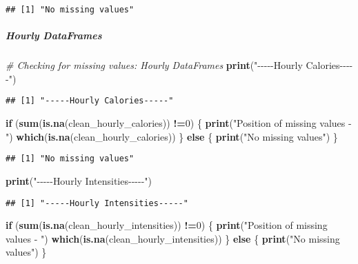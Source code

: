 \documentclass[
]{article}
\newenvironment{Shaded}{\begin{snugshade}}{\end{snugshade}}
\newcommand{\CommentTok}[1]{\textcolor[rgb]{0.56,0.35,0.01}{\textit{#1}}}
\newcommand{\ControlFlowTok}[1]{\textcolor[rgb]{0.13,0.29,0.53}{\textbf{#1}}}
\newcommand{\DecValTok}[1]{\textcolor[rgb]{0.00,0.00,0.81}{#1}}
\newcommand{\FunctionTok}[1]{\textcolor[rgb]{0.13,0.29,0.53}{\textbf{#1}}}
\newcommand{\NormalTok}[1]{#1}
\newcommand{\SpecialCharTok}[1]{\textcolor[rgb]{0.81,0.36,0.00}{\textbf{#1}}}
\newcommand{\StringTok}[1]{\textcolor[rgb]{0.31,0.60,0.02}{#1}}
\begin{document}
\begin{verbatim}
## [1] "No missing values"
\end{verbatim}

\hypertarget{hourly-dataframes-4}{%
\subparagraph{Hourly DataFrames}\label{hourly-dataframes-4}}

\begin{Shaded}
\begin{Highlighting}[]
\CommentTok{\# Checking for missing values: Hourly DataFrames}
\FunctionTok{print}\NormalTok{(}\StringTok{"{-}{-}{-}{-}{-}Hourly Calories{-}{-}{-}{-}{-}"}\NormalTok{)}
\end{Highlighting}
\end{Shaded}

\begin{verbatim}
## [1] "-----Hourly Calories-----"
\end{verbatim}

\begin{Shaded}
\begin{Highlighting}[]
\ControlFlowTok{if}\NormalTok{ (}\FunctionTok{sum}\NormalTok{(}\FunctionTok{is.na}\NormalTok{(clean\_hourly\_calories)) }\SpecialCharTok{!=}\DecValTok{0}\NormalTok{) \{}
  \FunctionTok{print}\NormalTok{(}\StringTok{"Position of missing values {-} "}\NormalTok{)}
  \FunctionTok{which}\NormalTok{(}\FunctionTok{is.na}\NormalTok{(clean\_hourly\_calories))}
\NormalTok{\} }\ControlFlowTok{else}\NormalTok{ \{}
  \FunctionTok{print}\NormalTok{(}\StringTok{"No missing values"}\NormalTok{)}
\NormalTok{\}}
\end{Highlighting}
\end{Shaded}

\begin{verbatim}
## [1] "No missing values"
\end{verbatim}

\begin{Shaded}
\begin{Highlighting}[]
\FunctionTok{print}\NormalTok{(}\StringTok{"{-}{-}{-}{-}{-}Hourly Intensities{-}{-}{-}{-}{-}"}\NormalTok{)}
\end{Highlighting}
\end{Shaded}

\begin{verbatim}
## [1] "-----Hourly Intensities-----"
\end{verbatim}

\begin{Shaded}
\begin{Highlighting}[]
\ControlFlowTok{if}\NormalTok{ (}\FunctionTok{sum}\NormalTok{(}\FunctionTok{is.na}\NormalTok{(clean\_hourly\_intensities)) }\SpecialCharTok{!=}\DecValTok{0}\NormalTok{) \{}
  \FunctionTok{print}\NormalTok{(}\StringTok{"Position of missing values {-} "}\NormalTok{)}
  \FunctionTok{which}\NormalTok{(}\FunctionTok{is.na}\NormalTok{(clean\_hourly\_intensities))}
\NormalTok{\} }\ControlFlowTok{else}\NormalTok{ \{}
  \FunctionTok{print}\NormalTok{(}\StringTok{"No missing values"}\NormalTok{)}
\NormalTok{\}}
\end{Highlighting}
\end{Shaded}
\end{document}

